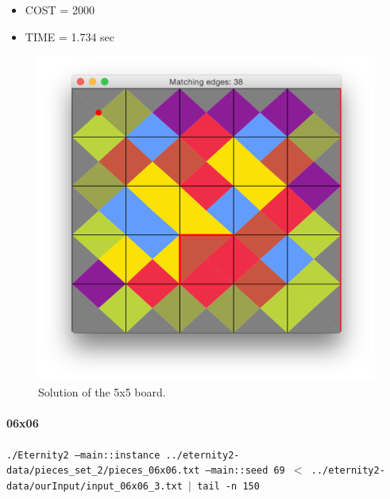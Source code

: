 	\begin{itemize}
		\item COST = 2000
		\item TIME = 1.734 sec
	\end{itemize}
	\begin{figure}[H]
	\centering
	\includegraphics[scale=0.25]{img/sol_05x05}
	\caption{Solution of the 5x5 board.}
	\end{figure}



	\paragraph{06x06}
	\texttt{./Eternity2 --main::instance ../eternity2-data/pieces\_set\_2/pieces\_06x06.txt --main::seed 69 $<$ ../eternity2-data/ourInput/input\_06x06\_3.txt $\mid$ tail -n 150}


